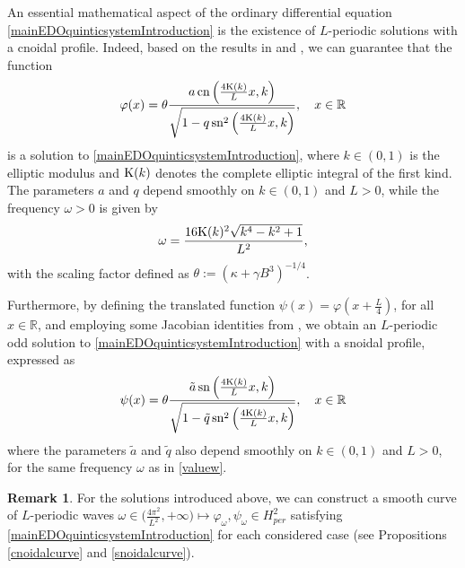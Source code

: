 \documentclass[10pt,reqno,a4paper]{amsart} %
\theoremstyle{definition} %
\numberwithin{equation}{section}
\numberwithin{figure}{section}
\newtheorem{remark}[theorem]{Remark}
\begin{document}
An essential mathematical aspect of the ordinary differential equation \eqref{mainEDOquinticsystemIntroduction} is the existence of $L$-periodic solutions with a cnoidal profile. Indeed, based on the results in \cite{BittencourtLoreno2022} and \cite{NataliCardosoAmaral}, we can guarantee that the function
\begin{equation*}\label{cnoidalsolutionIntroduction}
\varphi(x) = \theta \frac{a \, \text{cn} \left( \frac{4{\rm K}(k)}{L} x, k \right)}{\sqrt{1 - q \, \text{sn}^2 \left( \frac{4{\rm K}(k)}{L} x, k \right)}}, \quad x \in \mathbb{R}
\end{equation*}
is a solution to \eqref{mainEDOquinticsystemIntroduction}, where $k \in (0,1)$ is the elliptic modulus and ${\rm K}(k)$ denotes the complete elliptic integral of the first kind. The parameters $a$ and $q$ depend smoothly on $k \in (0,1)$ and $L>0$, while the frequency $\omega>0$ is given by
\begin{equation}\label{valuew}
\omega = \frac{16 {\rm K}(k)^2 \sqrt{k^4 - k^2 + 1}}{L^2},
\end{equation}
with the scaling factor defined as $\theta := (\kappa + \gamma B^3)^{-1/4}$.

Furthermore, by defining the translated function $\psi(x) = \varphi\left( x + \frac{L}{4} \right)$, for all $x \in \mathbb{R}$, and employing some Jacobian identities from \cite{byrd}, we obtain an $L$-periodic odd solution to \eqref{mainEDOquinticsystemIntroduction} with a snoidal profile, expressed as
\begin{equation}\label{psisolutionintro}
\psi(x) = \theta \frac{ \tilde{a} \, \text{sn}\left( \frac{4{\rm K}(k)}{L}x,k\right)}{\sqrt{ 1 - \tilde{q} \, \text{sn}^2 \left( \frac{4 {\rm K}(k)}{L} x, k \right)}}, \quad x \in \mathbb{R}
\end{equation}
where the parameters $\tilde{a}$ and $\tilde{q}$ also depend smoothly on $k \in (0,1)$ and $L>0$, for the same frequency $\omega$ as in \eqref{valuew}.

\begin{remark}
    For the solutions introduced above, we can construct a smooth curve of $L$-periodic waves $\omega \in \big( \tfrac{4\pi^2}{L^2}, +\infty \big) \longmapsto \varphi_\omega, \psi_\omega \in H^2_{per}$ satisfying \eqref{mainEDOquinticsystemIntroduction} for each considered case (see Propositions \ref{cnoidalcurve} and \ref{snoidalcurve}).
\end{remark}
\end{document}
